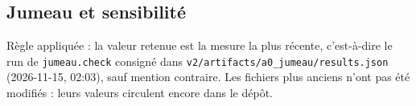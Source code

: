 \begingroup\sloppy\setlength{\emergencystretch}{3em}%

\subsection{Jumeau et sensibilité}\label{jum:ann}

Règle appliquée : la valeur retenue est la mesure la plus récente, c'est-à-dire le run de \texttt{jumeau.check}
consigné dans \texttt{v2/artifacts/a0\_jumeau/results.json} (2026-11-15, 02:03), sauf mention contraire. Les fichiers
plus anciens n'ont pas été modifiés : leurs valeurs circulent encore dans le dépôt.

